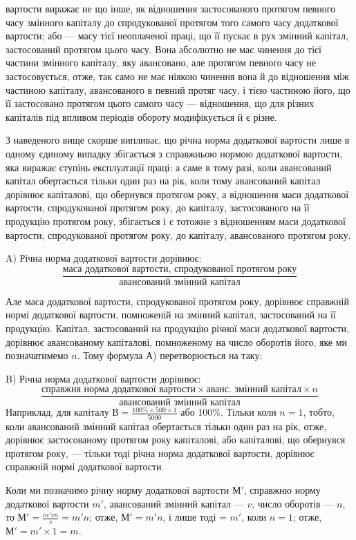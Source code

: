 \parcont{}  %
вартости виражає не що інше, як відношення застосованого протягом
певного часу змінного капіталу до спродукованої протягом того самого
часу додаткової вартости; або — масу тієї неоплаченої праці, що її пускає
в рух змінний капітал, застосований протягом цього часу. Вона абсолютно
не має чинення до тієї частини змінного капіталу, яку авансовано,
але протягом певного часу не застосовується, отже, так само не
має ніякою чинення вона й до відношення між частиною капіталу, авансованого
в певний протяг часу, і тією частиною його, що її застосовано
протягом цього самого часу — відношення, що для різних капіталів
під впливом періодів обороту модифікується й є різне.

З наведеного вище скорше випливає, що річна норма додаткової вартости
лише в одному єдиному випадку збігається з справжньою нормою
додаткової вартости, яка виражає ступінь експлуатації праці: а саме в
тому разі, коли авансований капітал обертається тільки один раз на рік,
коли тому авансований капітал дорівнює капіталові, що обернувся протягом
року, а відношення маси додаткової вартости, спродукованої протягом
року, до капіталу, застосованого на її продукцію протягом року, збігається
і є тотожне з відношенням маси додаткової вартости, спродукованої
протягом року, до капіталу, авансованого протягом року.

A) Річна норма додаткової вартости дорівнює:\[
\frac{\text{маса додаткової вартости, спродукованої протягом року}}{\text{авансований змінний капітал}}
\]

Але маса додаткової вартости, спродукованої протягом року, дорівнює
справжній нормі додаткової вартости, помноженій на змінний капітал,
застосований на її продукцію. Капітал, застосований на продукцію
річної маси додаткової вартости, дорівнює авансованому капіталові, помноженому
на число оборотів його, яке ми позначатимемо $n$. Тому формула А) перетворюється на таку:

B) Річна норма додаткової вартости дорівнює:\[
\frac{\text{справжня норма додаткової вартости} × \text{аванс. змінний капітал} × n}{\text{авансований змінний капітал}}
\]
Наприклад, для капіталу $В = \frac{100\%×500×1}{5000}$ або 100\%. Тільки коли
$n = 1$, тобто, коли авансований змінний капітал обертається тільки
один раз на рік, отже, дорівнює застосованому протягом року капіталові,
або капіталові, що обернувся протягом року, — тільки тоді річна норма додаткової
вартости, дорівнює справжній нормі додаткової вартости.

Коли ми позначимо річну норму додаткової вартости $М'$, справжню норму
додаткової вартости $m'$, авансований змінний капітал — $v$, число оборотів
— $n$, то $М' = \frac{m'vn}{v}= m'n$; отже, $М' = m'n$, і лише тоді = $m'$, коли
$n = 1$; отже, $М' = m' × 1 = m$.
